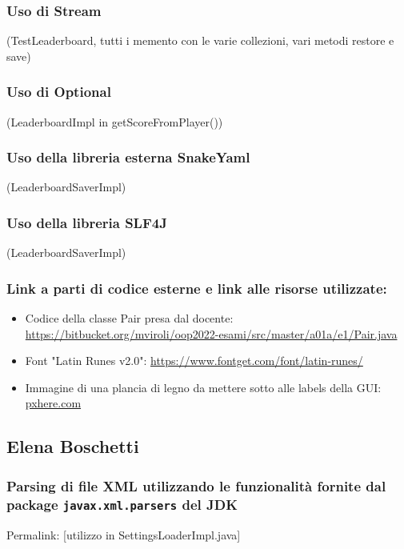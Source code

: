 \documentclass[a4paper,12pt]{report}
\begin{document}
\subsubsection{Uso di Stream}
(TestLeaderboard, tutti i memento con le varie collezioni, vari metodi restore e save)

\subsubsection{Uso di Optional}
(LeaderboardImpl in getScoreFromPlayer())

\subsubsection{Uso della libreria esterna SnakeYaml}
(LeaderboardSaverImpl)

\subsubsection{Uso della libreria SLF4J}
(LeaderboardSaverImpl)

\subsubsection{Link a parti di codice esterne e link alle risorse utilizzate:}

\begin{itemize}
	
	\item Codice della classe Pair presa dal docente: \url{https://bitbucket.org/mviroli/oop2022-esami/src/master/a01a/e1/Pair.java}
	\item Font "Latin Runes v2.0": \url{ https://www.fontget.com/font/latin-runes/}
	\item Immagine di una plancia di legno da mettere sotto alle labels della GUI: \href{https://get.pxhere.com/photo/background-tree-wood-boards-texture-wooden-background-old-brown-wood-texture-gray-wood-old-tree-old-fence-the-texture-of-the-wood-rustik-rustic-rural-wood-background-old-boards-fence-1370487.jpg}{pxhere.com}
	
\end{itemize}

\subsection{Elena Boschetti}

\subsubsection{Parsing di file XML utilizzando le funzionalità fornite dal package \texttt{javax.xml.parsers} del JDK}
Permalink: [utilizzo in SettingsLoaderImpl.java]
\end{document}
